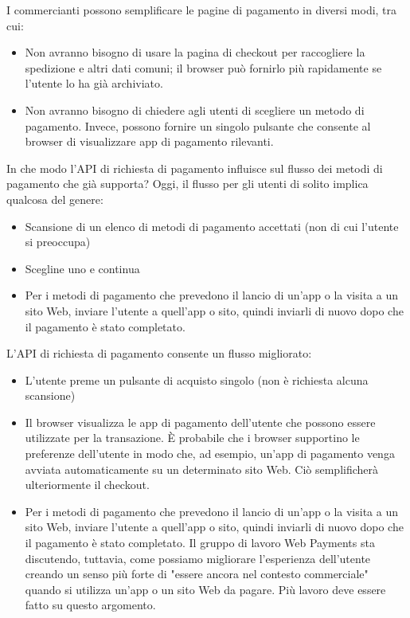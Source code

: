 \documentclass[italian]{article}
\begin{document}
	I commercianti possono semplificare le pagine di pagamento in diversi modi, tra cui:
	\begin{itemize}
	\item Non avranno bisogno di usare la pagina di checkout per raccogliere la spedizione e altri dati comuni; il browser può fornirlo più rapidamente se l'utente lo ha già archiviato.
	\item Non avranno bisogno di chiedere agli utenti di scegliere un metodo di pagamento. Invece, possono fornire un singolo pulsante che consente al browser di visualizzare app di pagamento rilevanti.
	\end{itemize}
	
	In che modo l'API di richiesta di pagamento influisce sul flusso dei metodi di pagamento che già supporta?
	Oggi, il flusso per gli utenti di solito implica qualcosa del genere:
	\begin{itemize}
	\item Scansione di un elenco di metodi di pagamento accettati (non di cui l'utente si preoccupa)
	\item Scegline uno e continua
	\item Per i metodi di pagamento che prevedono il lancio di un'app o la visita a un sito Web, inviare l'utente a quell'app o sito, quindi inviarli di nuovo dopo che il pagamento è stato completato.
	\end{itemize}
	L'API di richiesta di pagamento consente un flusso migliorato:
	\begin{itemize}
	\item L'utente preme un pulsante di acquisto singolo (non è richiesta alcuna scansione)
	\item Il browser visualizza le app di pagamento dell'utente che possono essere utilizzate per la transazione. È probabile che i browser supportino le preferenze dell'utente in modo che, ad esempio, un'app di pagamento venga avviata automaticamente su un determinato sito Web. Ciò semplificherà ulteriormente il checkout.
	\item Per i metodi di pagamento che prevedono il lancio di un'app o la visita a un sito Web, inviare l'utente a quell'app o sito, quindi inviarli di nuovo dopo che il pagamento è stato completato. Il gruppo di lavoro Web Payments sta discutendo, tuttavia, come possiamo migliorare l'esperienza dell'utente creando un senso più forte di "essere ancora nel contesto commerciale" quando si utilizza un'app o un sito Web da pagare. Più lavoro deve essere fatto su questo argomento.
	\end{itemize}
	
\end{document}
